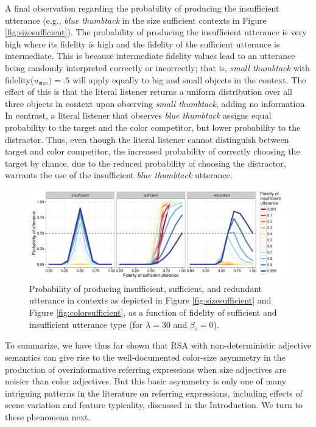 \documentclass[11pt]{article}
\newcommand{\figref}[1]{Figure \ref{#1}}
\begin{document}
A final observation regarding the probability of producing the insufficient utterance (e.g., \emph{blue thumbtack} in the size sufficient contexts in \figref{fig:sizesufficient}). The probability of producing the insufficient utterance is very high where its fidelity is high and the fidelity of the sufficient utterance is intermediate. This is because intermediate fidelity values lead to an utterance being randomly interpreted correctly or incorrectly; that is, \emph{small thumbtack} with  fidelity($u_{\textrm{size}}) = .5$ will apply equally to big and small objects in the context. The effect of this is that the literal listener returns a uniform distribution over all three objects in context upon observing \emph{small thumbtack}, adding no information. In contrast, a literal listener that observes \emph{blue thumbtack} assigns equal probability to the target and the color competitor, but lower probability to the distractor. Thus, even though the literal listener cannot distinguish between target and color competitor, the increased probability of correctly choosing the target by chance, due to the reduced probability of choosing the distractor, warrants the use of the insufficient \emph{blue thumbtack} utterance.  

\begin{figure}
\includegraphics[width=\textwidth]{pics/modelexploration-fidelityeffect-unlogged-wide}
\caption{Probability of producing insufficient, sufficient, and redundant utterance in contexts as depicted in \figref{fig:sizesufficient} and \figref{fig:colorsufficient}, as a function of fidelity of sufficient and insufficient utterance type (for $\lambda = 30$ and $ \beta_c = 0$).}
\label{fig:basicasymmetry}
\end{figure}

To summarize, we have thus far shown that RSA with non-deterministic adjective semantics can give rise to the well-documented color-size asymmetry in the production of overinformative referring expressions when size adjectives are noisier than color adjectives. But this basic asymmetry is only one of many intriguing patterns in the literature on referring expressions, including effects of scene variation and feature typicality, discussed in the Introduction. We turn to these phenomena next.
\end{document}
